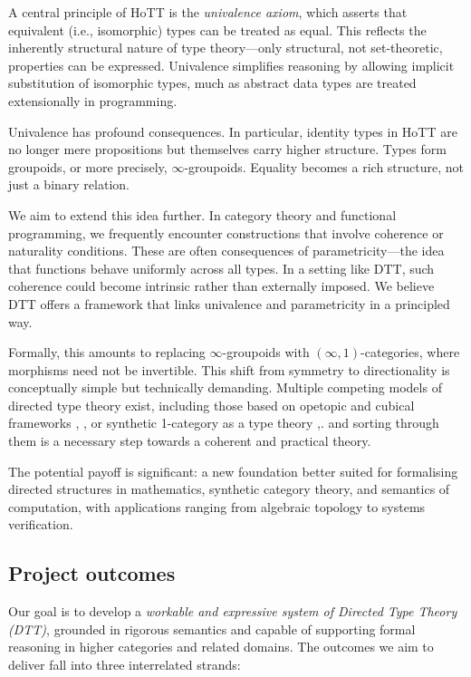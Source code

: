\documentclass[a4paper,11pt]{article}
\let\oldcite\cite
\renewcommand*\cite[1]{{\protect\NoHyper\oldcite{#1}\protect\endNoHyper}}
\begin{document}
A central principle of HoTT is the \emph{univalence axiom}, which asserts
that equivalent (i.e., isomorphic) types can be treated as equal. This
reflects the inherently structural nature of type theory—only
structural, not set-theoretic, properties can be expressed. Univalence
simplifies reasoning by allowing implicit substitution of isomorphic
types, much as abstract data types are treated extensionally in
programming.

Univalence has profound consequences. In particular, identity types in
HoTT are no longer mere propositions but themselves carry higher
structure. Types form groupoids, or more precisely,
$\infty$-groupoids. Equality becomes a rich structure, not just a
binary relation.

We aim to extend this idea further. In category theory and functional
programming, we frequently encounter constructions that involve
coherence or naturality conditions. These are often consequences of
parametricity—the idea that functions behave uniformly across all
types. In a setting like DTT, such coherence could become intrinsic
rather than externally imposed. We believe DTT offers a framework that
links univalence and parametricity in a principled way.

Formally, this amounts to replacing $\infty$-groupoids with
$(\infty,1)$-categories, where morphisms need not be invertible. This
shift from symmetry to directionality is conceptually simple but
technically demanding. Multiple competing models of directed type
theory exist, including those based on opetopic and cubical frameworks
\cite{riehlshulman2017}, \cite{licata2016}, or synthetic
1-category as a type theory \cite{north_2019},\cite{altenkirch_neumann_2024}.
and sorting through them is a necessary step towards a coherent and practical theory.

The potential payoff is significant: a new foundation better suited
for formalising directed structures in mathematics, synthetic category
theory, and semantics of computation, with applications ranging from
algebraic topology to systems verification.

\subsection{Project outcomes}\label{project-outcomes}

Our goal is to develop a \emph{workable and expressive system of Directed Type Theory (DTT)}, grounded in rigorous semantics and capable of supporting formal reasoning in higher categories and related domains. The outcomes we aim to deliver fall into three interrelated strands:
\end{document}

